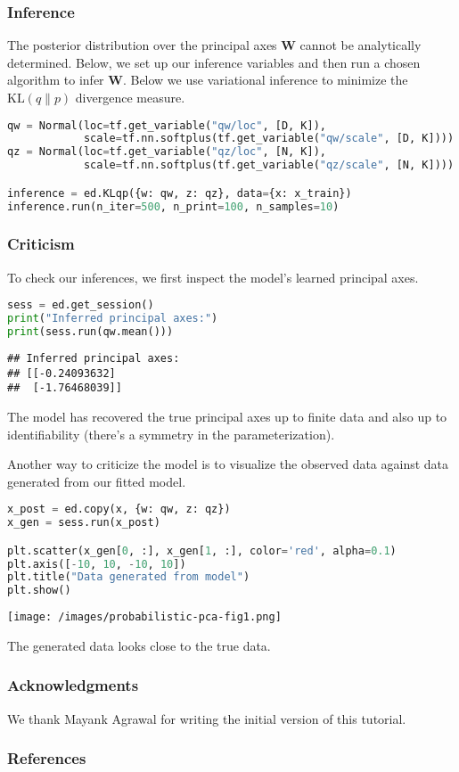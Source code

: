 \subsubsection{Inference}

The posterior distribution over the principal axes $\mathbf{W}$ cannot
be analytically determined. Below, we set up our inference variables
and then run a chosen algorithm to infer $\mathbf{W}$. Below we use
variational inference to minimize the $\text{KL}(q\|p)$ divergence
measure.

\begin{lstlisting}[language=Python]
qw = Normal(loc=tf.get_variable("qw/loc", [D, K]),
            scale=tf.nn.softplus(tf.get_variable("qw/scale", [D, K])))
qz = Normal(loc=tf.get_variable("qz/loc", [N, K]),
            scale=tf.nn.softplus(tf.get_variable("qz/scale", [N, K])))

inference = ed.KLqp({w: qw, z: qz}, data={x: x_train})
inference.run(n_iter=500, n_print=100, n_samples=10)
\end{lstlisting}

\subsubsection{Criticism}

To check our inferences, we first inspect the model's learned
principal axes.

\begin{lstlisting}[language=Python]
sess = ed.get_session()
print("Inferred principal axes:")
print(sess.run(qw.mean()))
\end{lstlisting}

\begin{lstlisting}
## Inferred principal axes:
## [[-0.24093632]
##  [-1.76468039]]
\end{lstlisting}

The model has recovered the true principal axes up to finite data and
also up to identifiability (there's a symmetry in the
parameterization).

Another way to criticize the model is to visualize the observed data
against data generated from our fitted model.

\begin{lstlisting}[language=Python]
x_post = ed.copy(x, {w: qw, z: qz})
x_gen = sess.run(x_post)

plt.scatter(x_gen[0, :], x_gen[1, :], color='red', alpha=0.1)
plt.axis([-10, 10, -10, 10])
plt.title("Data generated from model")
plt.show()
\end{lstlisting}

\texttt{[image: /images/probabilistic-pca-fig1.png]}

The generated data looks close to the true data.

\subsubsection{Acknowledgments}

We thank Mayank Agrawal for writing the initial version of this
tutorial.

\subsubsection{References}\label{references}
